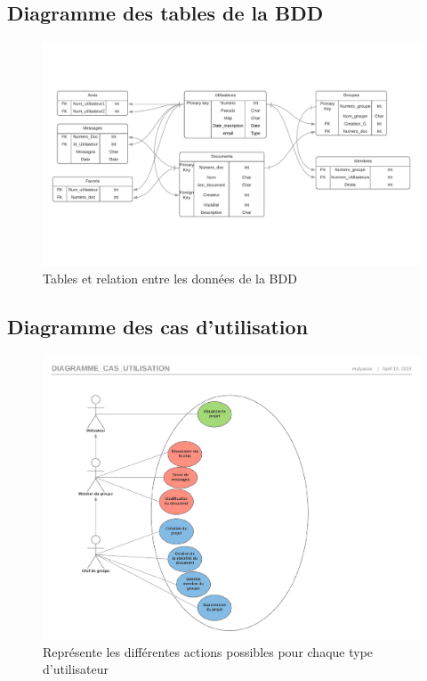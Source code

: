 \documentclass[11pt,a4paper]{article}
\begin{document}
\subsection{Diagramme des tables de la BDD}
\begin{figure}[!h]
\centering
\includegraphics[angle=270, scale=0.7]{Image/Diagramme_BDD.pdf}
\caption{Tables et relation entre les données de la BDD}
\end{figure}
\newpage
\subsection{Diagramme des cas d'utilisation}
\begin{figure}[!h]
\includegraphics[scale=0.7]{Image/Diagramme_cas_utilisation.pdf}
\caption{Représente les différentes actions possibles pour chaque type d'utilisateur}
\end{figure}
\newpage
\end{document}
